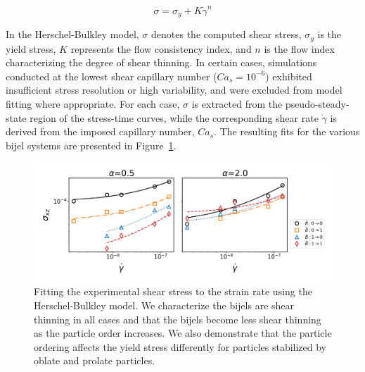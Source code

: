 \begin{equation}
    \sigma = \sigma_{y} + K\dot{\gamma}^{n}    
\end{equation}

In the Herschel-Bulkley model, $\sigma$ denotes the computed shear stress, $\sigma_y$ is the yield stress, $K$ represents the flow consistency index, 
and $n$ is the flow index characterizing the degree of shear thinning. In certain cases, simulations conducted at the lowest shear capillary number 
($Ca_s = 10^{-6}$) exhibited insufficient stress resolution or high variability, and were excluded from model fitting where appropriate. For each case, 
$\sigma$ is extracted from the pseudo-steady-state region of the stress-time curves, while the corresponding shear rate $\dot{\gamma}$ is derived from 
the imposed capillary number, $Ca_s$. The resulting fits for the various bijel systems are presented in Figure~\ref{fig:stress_strain}.

\begin{figure} 
    \centering 
    \includegraphics[scale=0.5]{../figures/results/paper3/stress_strain-all.png} 
    \caption{Fitting the experimental shear stress to the strain rate using the Herschel-Bulkley model. We characterize the bijels are 
             shear thinning in all cases and that the bijels become less shear thinning as the particle order increases. We also
             demonstrate that the particle ordering affects the yield stress differently for particles stabilized by oblate and 
             prolate particles.} 
    \label{fig:stress_strain} 
\end{figure}

